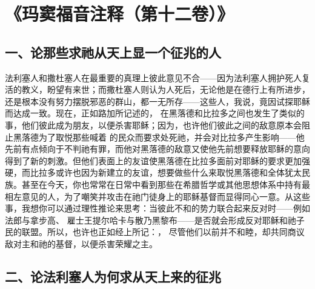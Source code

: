 

\section{《玛窦福音注释（第十二卷）》}


\subsection{一、论那些求祂从天上显一个征兆的人}

  法利塞人和撒杜塞人在最重要的真理上彼此意见不合——因为法利塞人拥护死人复活的教义，盼望有来世；而撒杜塞人则认为人死后，无论他是在德行上有所进步，还是根本没有努力摆脱邪恶的群山，都一无所存——这些人，我说，竟因试探耶稣而达成一致。现在，正如路加所记述的， 在黑落德和比拉多之间也发生了类似的事，他们彼此成为朋友，以便杀害耶稣；因为，也许他们彼此之间的敌意原本会阻止黑落德为了取悦那些喊着 的民众而要求处死祂，并会对比拉多产生影响——他先前有点倾向于不判祂有罪，而他对黑落德的敌意又使他先前想要释放耶稣的意向得到了新的刺激。但他们表面上的友谊使黑落德在比拉多面前对耶稣的要求更加强硬，而比拉多或许也因为新建立的友谊，想要做些什么来取悦黑落德和全体犹太民族。甚至在今天，你也常常在日常中看到那些在希腊哲学或其他思想体系中持有最相左意见的人，为了嘲笑并攻击在祂门徒身上的耶稣基督而显得同心一意。从这些事，我想你可以通过理性推论来思考：当彼此不和的势力联合起来反对时——例如法郎与拿步高、 雇士王提尔哈卡与散乃黑黎布——是否就会形成反对耶稣和祂子民的联盟。所以，也许也正如经上所记：， 尽管他们以前并不和睦，却共同商议敌对主和祂的基督，以便杀害荣耀之主。\par


\subsection{二、论法利塞人为何求从天上来的征兆}

